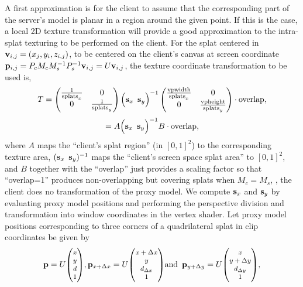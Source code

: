 A first approximation is for the client to assume that the corresponding part of
the server's model is planar in a region around the given point. If this is the
case, a local 2D texture transformation will provide a good approximation to the
intra-splat texturing to be performed on the client. For the splat centered in
$\mathbf{v}_{i, j} = (x_j, y_i, z_{i, j})$, to be centered on the client's canvas at
screen coordinate $\mathbf{p}_{i, j} = P_c M_c M_s^{-1} P_s^{-1}\mathbf{v}_{i, j} = U\mathbf{v}_{i,
j}$, the texture coordinate transformation to be used is,
\[
  T =
  \begin{pmatrix}
    \frac{1}{\text{splats}_x} & 0 \\
    0 & \frac{1}{\text{splats}_y}
  \end{pmatrix}
  \Big( \mathbf{s}_x \, \, \, \mathbf{s}_y \Big)^{-1}
  \begin{pmatrix} 
    \frac{\text{vpwidth}}{\text{splats}_x} & 0 \\
     0 & \frac{\text{vpheight}}{\text{splats}_y}
  \end{pmatrix}
  \cdot \text{overlap},
\]
\[
   =
  A
  \Big( \mathbf{s}_x \, \, \, \mathbf{s}_y \Big)^{-1}
  B
  \cdot \text{overlap},
\]
where $A$ maps the ``client's splat region'' (in $[0, 1]^2$) to the
corresponding texture area, $(\mathbf{s}_{x} \, \, \, \mathbf{s}_{y})^{-1}$ maps the
``client's screen space splat area'' to $[0, 1]^2$, and $B$ together with the
``overlap'' just provides a scaling factor so that ``overlap=1'' produces
non-overlapping but covering splats when $M_c=M_s$, \ie, the client does no
transformation of the proxy model.
%
%
We compute $\mathbf{s}_{x}$ and $\mathbf{s}_{y}$ by evaluating proxy model positions and
performing the perspective division and transformation into window coordinates
in the vertex shader. Let proxy model positions corresponding to three corners
of a quadrilateral splat in clip coordinates be
given by
\[
  \pv =
  U { \small \begin{pmatrix} x \\ y \\ d \\ 1 \end{pmatrix} },
  \pv_{x+\Delta x} =
  U { \small \begin{pmatrix} x+\Delta x \\ y \\ d_{\Delta x} \\ 1 \end{pmatrix} }
  \text{and}\, \, \, 
  \pv_{y+\Delta y} =
  U { \small \begin{pmatrix} x \\ y+\Delta y \\ d_{\Delta y} \\ 1 \end{pmatrix} },
\]
